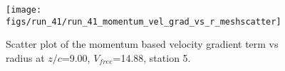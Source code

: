 \begin{figure}[H]
\centering
\texttt{[image: figs/run\_41/run\_41\_momentum\_vel\_grad\_vs\_r\_meshscatter]}
\caption{Scatter plot of the momentum based velocity gradient term vs radius at $z/c$=9.00, $V_{free}$=14.88, station 5.}
\label{fig:run_41_momentum_vel_grad_vs_r_meshscatter}
\end{figure}


